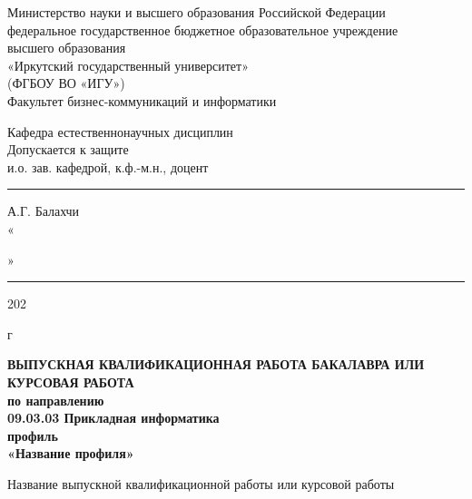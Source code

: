 \thispagestyle{titlepage}

    \begin{center}
    \linespread{1}
		Министерство науки и высшего образования  Российской Федерации\\
федеральное государственное бюджетное образовательное учреждение\\
высшего образования\\
«Иркутский государственный университет»\\
(ФГБОУ ВО «ИГУ»)\\
Факультет бизнес-коммуникаций и информатики 
    \end{center}
\vspace{1cm}    
\hspace{8cm} 
\begin{minipage}{0.5\textwidth}
\linespread{1}
  \begin{flushleft}
	\small{
    Кафедра естественнонаучных дисциплин \\%
Допускается к защите \\
и.о. зав. кафедрой, к.ф.-м.н., доцент \\
\rule{2,1cm}{0,1pt} А.Г. Балахчи\\		
            «\rule{0,9cm}{0,1pt}»\rule{2,7cm}{0,1pt} 202\,\rule{0,2cm}{0,1pt} г \\		}
		
		
		\end{flushleft}
\end{minipage}


    \vspace{2cm} %
    \begin{center}
   {\bf ВЫПУСКНАЯ КВАЛИФИКАЦИОННАЯ РАБОТА БАКАЛАВРА ИЛИ КУРСОВАЯ РАБОТА\\
    по направлению  \\
		09.03.03 Прикладная информатика\\
		профиль\\
		«Название профиля»\\}
    \end{center}
		
    \begin{center}
  		Название выпускной квалификационной работы или курсовой работы\\
    \end{center}
		

